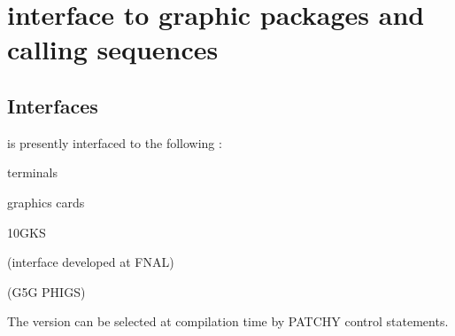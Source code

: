 \chapter{\HIGZ{} interface to graphic packages and calling sequences}
\section{Interfaces}
\par
\HIGZ{} is presently interfaced to the following \UGP:
\begin{ULc}
\item {}
\item \GL
\item \GPR
\item \PS
\item \FALCO{} terminals
\item \MSDOS{} graphics cards
\item \MAC
\item \GKSGRAL
\item \PLOT10GKS
\item \MGKS
\item \NOVAGKS
\item \DECGKS
\item \ATCGKS
\item \SUNGKS
\item \UNIGKS
\item {} (interface developed at FNAL)
\item \GPHIGS{} (G5G PHIGS)
\item \GDDM
\end{ULc}
The \UGP{} version can be selected at compilation time by PATCHY control
statements.


